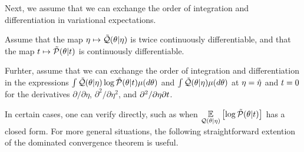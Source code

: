 Next, we assume that we can exchange the order of integration and
differentiation in variational expectations.

%
\begin{assu}
%
Assume that the map $\eta \mapsto \tilde{\mathcal{Q}}(\theta \vert \eta)$ is twice
continuously differentiable, and that the map $t \mapsto \tilde{\mathcal{P}}(\theta \vert
t)$ is continuously differentiable.


Furhter, assume that we can exchange the order of integration and
differentiation in the expressions $\int \tilde{\mathcal{Q}}(\theta \vert \eta) \log
\tilde{\mathcal{P}}(\theta \vert t) \mu(d\theta)$ and $\int \tilde{\mathcal{Q}}(\theta \vert \eta)
\mu(d\theta)$ at $\eta = \hat\eta$ and $t = 0$ for the derivatives $\partial /
\partial \eta$, $\partial^2 / \partial \eta^2$, and $\partial^2 / \partial \eta
\partial t$.
%
\end{assu}

In certain cases, one can verify  directly, such as when
$\underset{\mathcal{Q}(\theta \vert \eta)}{\mathbb{E}}\left[\log \tilde{\mathcal{P}}(\theta \vert t)\right]$ has a closed form.
For more general situations, the following straightforward extention of the
dominated convergence theorem \citep[Theorem 16.8]{billingsley:1986:probability}
is useful.


